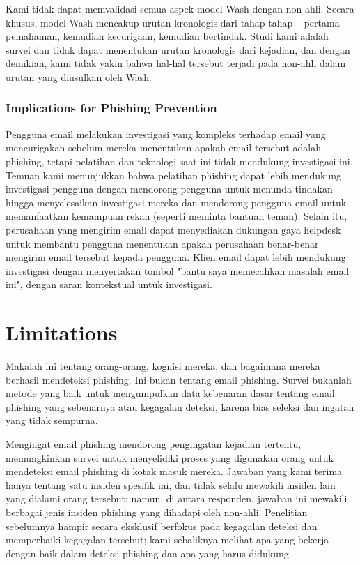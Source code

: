 \documentclass[lettersize,journal]{IEEEtran}
\begin{document}
Kami tidak dapat memvalidasi semua aspek model Wash dengan non-ahli. Secara
khusus, model Wash mencakup urutan kronologis dari tahap-tahap – pertama
pemahaman, kemudian kecurigaan, kemudian bertindak. Studi kami adalah survei
dan tidak dapat menentukan urutan kronologis dari kejadian, dan dengan
demikian, kami tidak yakin bahwa hal-hal tersebut terjadi pada non-ahli dalam
urutan yang diusulkan oleh Wash.

\subsubsection{Implications for Phishing Prevention}
Pengguna email melakukan investigasi yang kompleks terhadap email yang
mencurigakan sebelum mereka menentukan apakah email tersebut adalah phishing,
tetapi pelatihan dan teknologi saat ini tidak mendukung investigasi ini. Temuan
kami menunjukkan bahwa pelatihan phishing dapat lebih mendukung investigasi
pengguna dengan mendorong pengguna untuk menunda tindakan hingga menyelesaikan
investigasi mereka dan mendorong pengguna email untuk memanfaatkan kemampuan
rekan (seperti meminta bantuan teman). Selain itu, perusahaan yang mengirim
email dapat menyediakan dukungan gaya helpdesk untuk membantu pengguna
menentukan apakah perusahaan benar-benar mengirim email tersebut kepada
pengguna. Klien email dapat lebih mendukung investigasi dengan menyertakan
tombol "bantu saya memecahkan masalah email ini", dengan saran kontekstual
untuk investigasi.

\section{Limitations}
Makalah ini tentang orang-orang, kognisi mereka, dan bagaimana mereka berhasil
mendeteksi phishing. Ini bukan tentang email phishing. Survei bukanlah metode
yang baik untuk mengumpulkan data kebenaran dasar tentang email phishing yang
sebenarnya atau kegagalan deteksi, karena bias seleksi dan ingatan yang tidak
sempurna.

Mengingat email phishing mendorong pengingatan kejadian tertentu, memungkinkan
survei untuk menyelidiki proses yang digunakan orang untuk mendeteksi email
phishing di kotak masuk mereka. Jawaban yang kami terima hanya tentang satu
insiden spesifik ini, dan tidak selalu mewakili insiden lain yang dialami orang
tersebut; namun, di antara responden, jawaban ini mewakili berbagai jenis
insiden phishing yang dihadapi oleh non-ahli. Penelitian sebelumnya hampir
secara eksklusif berfokus pada kegagalan deteksi dan memperbaiki kegagalan
tersebut; kami sebaliknya melihat apa yang bekerja dengan baik dalam deteksi
phishing dan apa yang harus didukung.
\end{document}
